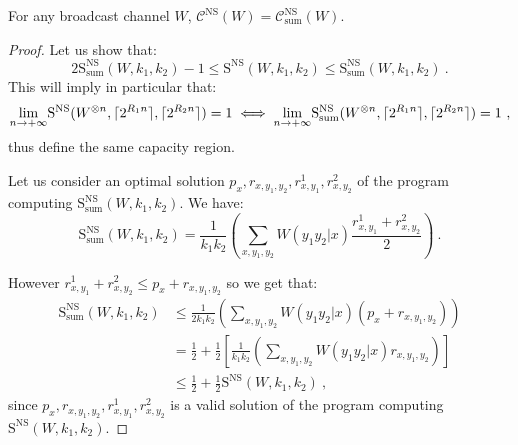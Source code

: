\begin{proposition}
    For any broadcast channel $W$, $\mathcal{C}^{\mathrm{NS}}(W) = \mathcal{C}^{\mathrm{NS}}_{\text{sum}}(W)$.
\end{proposition}
\begin{proof}
Let us show that:
\[ 2 \mathrm{S}_{\text{sum}}^{\mathrm{NS}}(W,k_1,k_2)-1 \leq  \mathrm{S}^{\mathrm{NS}}(W,k_1,k_2) \leq \mathrm{S}_{\text{sum}}^{\mathrm{NS}}(W,k_1,k_2) \ . \]
This will imply in particular that:
\[ \underset{n \rightarrow +\infty}{\lim} \mathrm{S}^{\mathrm{NS}}(W^{\otimes n},\lceil2^{R_1n}\rceil,\lceil2^{R_2n}\rceil) = 1 \iff \underset{n \rightarrow +\infty}{\lim} \mathrm{S}^{\mathrm{NS}}_{\text{sum}}(W^{\otimes n},\lceil2^{R_1n}\rceil,\lceil2^{R_2n}\rceil) = 1 \ ,\]
thus define the same capacity region.

Let us consider an optimal solution $p_x,r_{x,y_1,y_2},r^1_{x,y_1},r^2_{x,y_2}$ of the program computing $\mathrm{S}_{\text{sum}}^{\mathrm{NS}}(W,k_1,k_2)$. We have:
\[ \mathrm{S}_{\text{sum}}^{\mathrm{NS}}(W,k_1,k_2) = \frac{1}{k_1k_2}\left(\sum_{x,y_1,y_2} W(y_1y_2|x)\frac{r^1_{x,y_1} + r^2_{x,y_2}}{2}\right) \ . \]

  However $r^1_{x,y_1} + r^2_{x,y_2} \leq p_x + r_{x,y_1,y_2}$ so we get that:
  \begin{equation}
    \begin{aligned}
      \mathrm{S}_{\text{sum}}^{\mathrm{NS}}(W,k_1,k_2) &\leq \frac{1}{2k_1k_2}\left(\sum_{x,y_1,y_2} W(y_1y_2|x)\left( p_x + r_{x,y_1,y_2}\right)\right)\\
      &= \frac{1}{2} + \frac{1}{2}\left[\frac{1}{k_1k_2}\left(\sum_{x,y_1,y_2} W(y_1y_2|x)r_{x,y_1,y_2}\right)\right]\\
      &\leq \frac{1}{2} + \frac{1}{2}\mathrm{S}^{\mathrm{NS}}(W,k_1,k_2) \ ,
    \end{aligned}
  \end{equation}
  since $p_x,r_{x,y_1,y_2},r^1_{x,y_1},r^2_{x,y_2}$ is a valid solution of the program computing $\mathrm{S}^{\mathrm{NS}}(W,k_1,k_2)$.


\end{proof}
